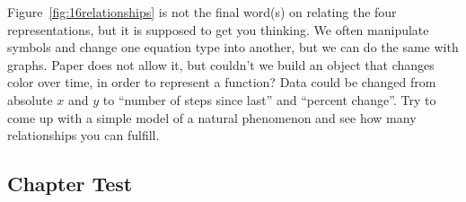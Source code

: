 Figure~\ref{fig:16relationships} is not the final word(s) on relating the four representations,
but it is supposed to get you thinking.  We often manipulate symbols and change one
equation type into another, but we can do the same with graphs.  Paper does not
allow it, but couldn't we build an object that changes color over time, in order to
represent a function?  Data could be changed from absolute $x$ and $y$ to
``number of steps since last'' and ``percent change''.  Try to come up with a simple 
model of a natural phenomenon and see how many relationships you can
fulfill.

\subsection{Chapter Test}
\noindent{}
\newpage
